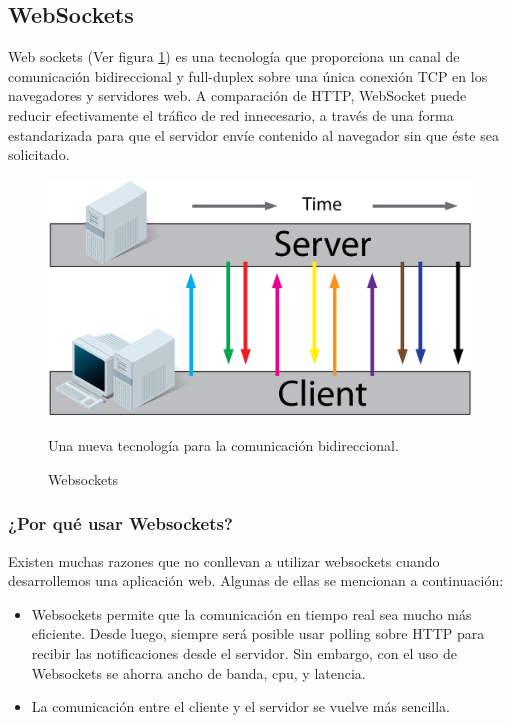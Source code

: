 \subsection{WebSockets}
Web sockets (Ver figura \ref{fig:websockets}) es una tecnología que proporciona un canal de comunicación bidireccional y full-duplex sobre una única conexión TCP en los navegadores y servidores web. A comparación de HTTP, WebSocket puede reducir efectivamente el tráfico de red innecesario, a través de una forma estandarizada para que el servidor envíe contenido al navegador sin que éste sea solicitado.\cite{cheng_new_2013}\\

\begin{figure}[h]
  \centering
  \includegraphics[scale=0.6]{figuras/websockets.png}\\
  \caption{Websockets}{Una nueva tecnología para la comunicación bidireccional.}\label{fig:websockets}
\end{figure}

\subsubsection{¿Por qué usar Websockets?}

Existen muchas razones que no conllevan a utilizar websockets cuando desarrollemos una aplicación web. Algunas de ellas se mencionan a continuación:

\begin{itemize}
  \item Websockets permite que la comunicación en tiempo real sea mucho más eficiente. Desde luego, siempre será posible usar polling sobre HTTP para recibir las notificaciones desde el servidor. Sin embargo, con el uso de Websockets se ahorra ancho de banda, cpu, y latencia.
  \item La comunicación entre el cliente y el servidor se vuelve más sencilla.
\end{itemize}

